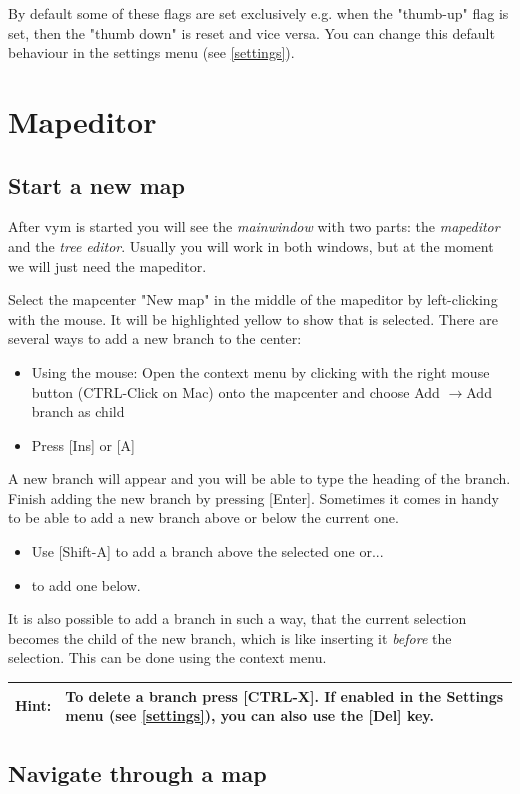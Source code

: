 \documentclass[12pt,a4paper]{article}
\newcommand{\hint}[1]{
    \begin{center} 
        \begin{tabular}{|rp{12cm}|} \hline
            {\bf Hint}:& #1\\   \hline
        \end{tabular}
            \marginpar{\Huge !} 
    \end{center} 
}
\newcommand{\vym}{{\sc vym }}
\newcommand{\ra}{$\longrightarrow$}
\newcommand{\key}[1]{[#1]}
\begin{document}
By default some of these flags are set exclusively e.g. when the 
"thumb-up" flag is set, then the "thumb down" is reset and vice
versa. You can change this default behaviour in the settings menu (see
\ref{settings}).

\section{Mapeditor} \label {mapeditor}
\subsection{Start a new map}
After \vym is started you will see the {\em mainwindow} with two parts: the {\em mapeditor} and the
{\em tree editor}. Usually you will work in both windows, but at the
moment we will just need the mapeditor. 

Select the mapcenter "New map" in the middle of the mapeditor by
left-clicking with the mouse. It will be highlighted yellow to show that
is selected. There are several ways to add a new branch to the center:
\begin{itemize}
    \item Using the mouse: Open the context menu by clicking with the
    right mouse button (CTRL-Click on Mac) onto the
    mapcenter and choose Add \ra Add branch as child
    \item Press \key{Ins} or \key{A}
\end{itemize}
A new branch will appear and you will be able to type the heading of the
branch. Finish adding the new branch by pressing \key{Enter}.
Sometimes it comes in handy to be able to add a new branch above or
below the current one. 
\begin{itemize}
    \item Use \key{Shift-A} to add a branch above the selected one or... 
    \item \key{Ctrl-A} to add one below. 
\end{itemize}
It is also possible to add a branch in such a way, that the current
selection becomes the child of the new branch, which is like inserting
it {\em before} the selection. This can be done using the context menu.

\hint{To delete a branch press \key{CTRL-X}. If enabled in the Settings
menu (see \ref{settings}), you can also use the \key{Del} key.}

\subsection{Navigate through a map}
\end{document}
